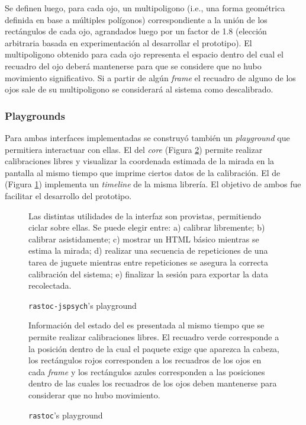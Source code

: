 Se definen luego, para cada ojo, un multipoligono (i.e., una forma geométrica
definida en base a múltiples polígonos) correspondiente a la unión de los
rectángulos de cada ojo, agrandados luego por un factor de 1.8 (elección
arbitraria basada en experimentación al desarrollar el prototipo).
El multipoligono obtenido para cada ojo representa el espacio dentro del cual
el recuadro del ojo deberá mantenerse para que se considere que no hubo
movimiento significativo.
Si a partir de algún \textit{frame} el recuadro de alguno de los ojos sale de
su multipoligono se considerará al sistema como descalibrado.

\subsubsection{Playgrounds}

Para ambas interfaces implementadas se construyó también un \textit{playground}
que permitiera interactuar con ellas.
El del \textit{core} (Figura \ref{fig:rastoc-playground}) permite realizar
calibraciones libres y visualizar la coordenada estimada de la mirada en la
pantalla al mismo tiempo que imprime ciertos datos de la calibración.
El de \jspsych (Figura \ref{fig:rastoc-jspsych-playground}) implementa un
\textit{timeline} de la misma librería.
El objetivo de ambos fue facilitar el desarrollo del prototipo.

\begin{figure}
    \centering
    \caption{\texttt{rastoc-jspsych}’s playground}
    Las distintas utilidades de la interfaz \jspsych son provistas, permitiendo
    ciclar sobre ellas.
    Se puede elegir entre:
    a) calibrar libremente;
    b) calibrar asistidamente;
    c) mostrar un HTML básico mientras se estima la mirada;
    d) realizar una secuencia de repeticiones de una tarea de juguete mientras
    entre repeticiones se asegura la correcta calibración del sistema;
    e) finalizar la sesión para exportar la data recolectada.
    \label{fig:rastoc-jspsych-playground}
\end{figure}

\begin{figure}
    \centering
    \caption{\texttt{rastoc}’s playground}
    Información del estado del \eyetracker es presentada al mismo tiempo que se
    permite realizar calibraciones libres.
    El recuadro verde corresponde a la posición dentro de la cual el paquete
    \webgazer exige que aparezca la cabeza, los rectángulos rojos corresponden
    a los recuadros de los ojos en cada \textit{frame} y los rectángulos azules
    corresponden a las posiciones dentro de las cuales los recuadros de los
    ojos deben mantenerse para considerar que no hubo movimiento.
    \label{fig:rastoc-playground}
\end{figure}

